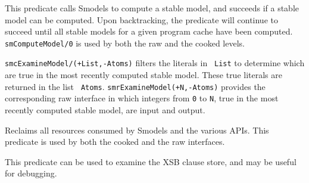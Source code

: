 \begin{description}
%
This predicate calls Smodels to compute a stable model, and succeeds
if a stable model can be computed.  Upon backtracking, the predicate
will continue to succeed until all stable models for a given program
cache have been computed.  {\tt smComputeModel/0} is used by both the
raw and the cooked levels.

%
{\tt smcExamineModel/(+List,-Atoms)} filters the literals in {\tt
  List} to determine which are true in the most recently computed
stable model.  These true literals are returned in the list {\tt
  Atoms}.  {\tt smrExamineModel(+N,-Atoms)} provides the corresponding
raw interface in which integers from {\tt 0} to {\tt N}, true in the
most recently computed stable model, are input and output.

%
Reclaims all resources consumed by Smodels and the various APIs.  This
predicate is used by both the cooked and the raw interfaces.

%
This predicate can be used to examine the XSB clause store, and may
be useful for debugging.

\end{description}

